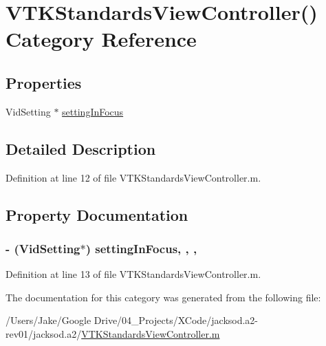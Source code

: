 \hypertarget{category_v_t_k_standards_view_controller_07_08}{\section{V\+T\+K\+Standards\+View\+Controller() Category Reference}
\label{category_v_t_k_standards_view_controller_07_08}
}
\subsection*{Properties}
\begin{DoxyCompactItemize}
\item 
Vid\+Setting $\ast$ \hyperlink{category_v_t_k_standards_view_controller_07_08_ac3149c7bb132a2a02cd19887536f25d9}{setting\+In\+Focus}
\end{DoxyCompactItemize}


\subsection{Detailed Description}


Definition at line 12 of file V\+T\+K\+Standards\+View\+Controller.\+m.



\subsection{Property Documentation}
\hypertarget{category_v_t_k_standards_view_controller_07_08_ac3149c7bb132a2a02cd19887536f25d9}{
\subsubsection[{setting\+In\+Focus}]{\setlength{\rightskip}{0pt plus 5cm}-\/ (Vid\+Setting$\ast$) setting\+In\+Focus\hspace{0.3cm}{\ttfamily [read]}, {\ttfamily [write]}, {\ttfamily [nonatomic]}, {\ttfamily [strong]}}}\label{category_v_t_k_standards_view_controller_07_08_ac3149c7bb132a2a02cd19887536f25d9}


Definition at line 13 of file V\+T\+K\+Standards\+View\+Controller.\+m.



The documentation for this category was generated from the following file\+:\begin{DoxyCompactItemize}
\item 
/\+Users/\+Jake/\+Google Drive/04\+\_\+\+Projects/\+X\+Code/jacksod.\+a2-\/rev01/jacksod.\+a2/\hyperlink{_v_t_k_standards_view_controller_8m}{V\+T\+K\+Standards\+View\+Controller.\+m}\end{DoxyCompactItemize}
